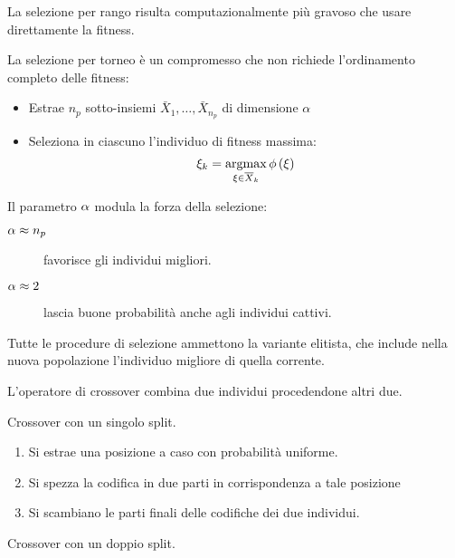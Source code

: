 \documentclass[\main/main.tex]{subfiles}
\begin{document}
\begin{multicols}{2}
\begin{observation}
    La selezione per rango risulta computazionalmente più gravoso che usare direttamente la fitness.
\end{observation}
\begin{definition}
    La selezione per torneo è un compromesso che non richiede l'ordinamento completo delle fitness:
    \begin{itemize}
        \item Estrae \(n_p\) sotto-insiemi \(\bar{X}_1, \ldots, \bar{X}_{n_p}\) di dimensione \(\alpha\)
        \item Seleziona in ciascuno l'individuo di fitness massima:
        \[
            \xi_k = \operatorname*{argmax}_{\xi \in \overline{X}_k} \phi\left(\xi\right)
        \]
    \end{itemize}
    
    Il parametro \(\alpha\) modula la forza della selezione:
    \begin{description}
        \item[\(\alpha\approx n_p\)] favorisce gli individui migliori.
        \item[\(\alpha\approx 2\)] lascia buone probabilità anche agli individui cattivi.
    \end{description}
\end{definition}
\begin{observation}
    Tutte le procedure di selezione ammettono la variante elitista, che include nella nuova popolazione l'individuo migliore di quella corrente.
\end{observation}
\begin{definition}[Crossover]
L'operatore di crossover combina due individui procedendone altri due.
\end{definition}
    \begin{definition}
        Crossover con un singolo split.
        \begin{enumerate}
            \item Si estrae una posizione a caso con probabilità uniforme.
            \item Si spezza la codifica in due parti in corrispondenza a tale posizione
            \item Si scambiano le parti finali delle codifiche dei due individui.
        \end{enumerate}
    \end{definition}
    \begin{definition}
        Crossover con un doppio split.
        \begin{enumerate}

\end{enumerate}
\end{definition}
\end{multicols}
\end{document}
